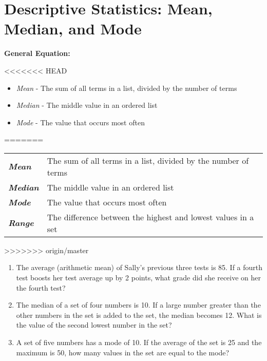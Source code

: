 \section{Descriptive Statistics: Mean, Median, and Mode}

\textbf{General Equation:}

<<<<<<< HEAD
\begin{itemize}[label=]
\item \textit{Mean} - The sum of all terms in a list, divided by the number of terms
\item \textit{Median} - The middle value in an ordered list
\item \textit{Mode} - The value that occurs most often
\end{itemize}
=======
\begin{center}
\renewcommand{\arraystretch}{1.5}
\begin{tabular}{>{\itshape\bfseries}ll}
Mean & The sum of all terms in a list, divided by the number of terms\\
Median & The middle value in an ordered list\\
Mode & The value that occurs most often\\
Range & The difference between the highest and lowest values in a set
\end{tabular}
\end{center}
>>>>>>> origin/master

\begin{enumerate}[labelindent=*,style=multiline,leftmargin=*,label=\textbf{Example \arabic*:}]
\item The average (arithmetic mean) of Sally's previous three tests is 85. If a fourth test boosts her test average up by 2 points, what grade did she receive on her the fourth test?
\vfill\item The median of a set of four numbers is 10. If a large number greater than the other numbers in the set is added to the set, the median becomes 12. What is the value of the second lowest number in the set?
\vfill\item A set of five numbers has a mode of 10. If the average of the set is 25 and the maximum is 50, how many values in the set are equal to the mode?
\end{enumerate}

